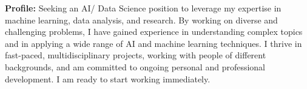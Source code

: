 \documentclass[a4paper,12pt]{article}
\begin{document}
\begin{center}
    \colorbox[HTML]{\primaryHTMLColorToUse}
     {\begin{minipage}[c]{16cm}
      \textbf{\textcolor{\primaryColorToUse}{Profile:}} {\textcolor{\objTextColorToUse}{Seeking an AI/ Data Science position to leverage my expertise in machine learning, data analysis, and research. By working on diverse and challenging problems, I have gained experience in understanding complex topics and in applying a wide range of AI and machine learning techniques. I thrive in fast-paced, multidisciplinary projects, working with people of different backgrounds, and am committed to ongoing personal and professional development. I am ready to start working immediately.
}}
     \end{minipage}}
\end{center}
\end{document}
